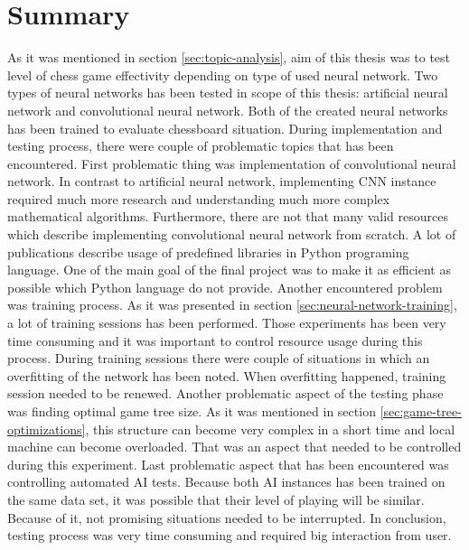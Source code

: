 \chapter{Summary}
As it was mentioned in section \ref{sec:topic-analysis}, aim of this thesis was to test level of chess game effectivity depending on type of used neural network. Two types of neural networks has been tested in scope of this thesis: artificial neural network and convolutional neural network. Both of the created neural networks has been trained to evaluate chessboard situation. During implementation and testing process, there were couple of problematic topics that has been encountered. First problematic thing was implementation of convolutional neural network. In contrast to artificial neural network, implementing CNN instance required much more research and understanding much more complex mathematical algorithms. Furthermore, there are not that many valid resources which describe implementing convolutional neural network from scratch. A lot of publications describe usage of predefined libraries in Python programing language. One of the main goal of the final project was to make it as efficient as possible which Python language do not provide. Another encountered problem was training process. As it was presented in section \ref{sec:neural-network-training}, a lot of training sessions has been performed. Those experiments has been very time consuming and it was important to control resource usage during this process. During training sessions there were couple of situations in which an overfitting of the network has been noted. When overfitting happened, training session needed to be renewed. Another problematic aspect of the testing phase was finding optimal game tree size. As it was mentioned in section \ref{sec:game-tree-optimizations}, this structure can become very complex in a short time and local machine can become overloaded. That was an aspect that needed to be controlled during this experiment. Last problematic aspect that has been encountered was controlling automated AI tests. Because both AI instances has been trained on the same data set, it was possible that their level of playing will be similar. Because of it, not promising situations needed to be interrupted. In conclusion, testing process was very time consuming and required big interaction from user.

